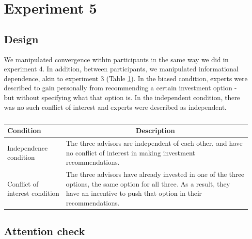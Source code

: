 \documentclass[
  doc,floatsintext]{apa6}
\begin{document}
\clearpage

\section{Experiment 5}\label{exp5}

\subsection{Design}\label{design-8}

\FloatBarrier

We manipulated convergence within participants in the same way we did in experiment 4. In addition, between participants, we manipulated informational dependence, akin to experiment 3 (Table \ref{tab:exp5-condition}). In the biased condition, experts were described to gain personally from recommending a certain investment option - but without specifying what that option is. In the independent condition, there was no such conflict of interest and experts were described as independent.

\begin{table}[tbp]

\begin{center}
\begin{threeparttable}

\caption{\label{tab:exp5-condition}}

\begin{tabular}{m{3cm}m{12cm}}
\toprule
Condition & \multicolumn{1}{c}{Description}\\
\midrule
Independence condition & The three advisors are independent of each other, and have no conflict of interest in making investment recommendations.\\
Conflict of interest condition & The three advisors have already invested in one of the three options, the same option for all three. As a result, they have an incentive to push that option in their recommendations.\\
\bottomrule
\end{tabular}

\end{threeparttable}
\end{center}

\end{table}

\subsection{Attention check}\label{attention-check-4}
\end{document}
